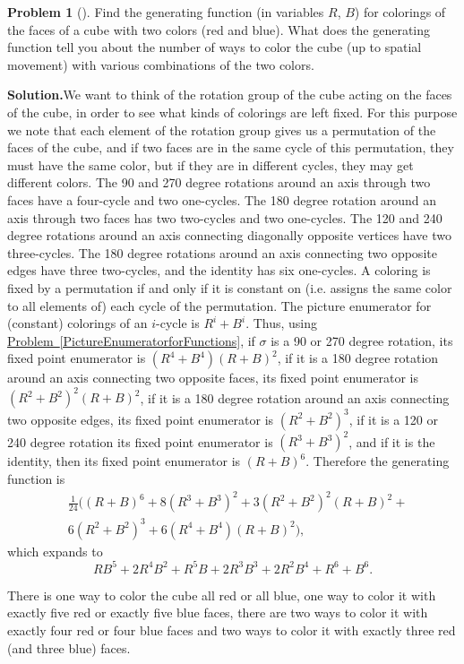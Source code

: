 \documentclass[10pt,]{book}
\theoremstyle{plain}
\theoremstyle{definition}
\newtheorem{activity}[project]{Problem}
\theoremstyle{definition}
\numberwithin{equation}{chapter}
\newcommand{\amp}{&}
\begin{document}
\begin{activity}[]\label{polya2}
Find the generating function (in variables \(R\), \(B\)) for colorings of the faces of a cube with two colors (red and blue). What does the generating function tell you about the number of ways to color the cube (up to spatial movement) with various combinations of the two colors.%
\par\medskip\noindent%
\textbf{Solution.}\quad We want to think of the rotation group of the cube acting on the faces of the cube, in order to see what kinds of colorings are left fixed. For this purpose we note that each element of the rotation group gives us a permutation of the faces of the cube, and if two faces are in the same cycle of this permutation, they must have the same color, but if they are in different cycles, they may get different colors. The 90 and 270 degree rotations around an axis through two faces have a four-cycle and two one-cycles. The 180 degree rotation around an axis through two faces has two two-cycles and two one-cycles. The 120 and 240 degree rotations around an axis connecting diagonally opposite vertices have two three-cycles. The 180 degree rotations around an axis connecting two opposite edges have three two-cycles, and the identity has six one-cycles. A coloring is fixed by a permutation if and only if it is constant on (i.e. assigns the same color to all elements of) each cycle of the permutation. The picture enumerator for (constant) colorings of an \(i\)-cycle is \(R^i+B^i\). Thus, using \hyperref[PictureEnumeratorforFunctions]{Problem~\ref{PictureEnumeratorforFunctions}}, if \(\sigma\) is a 90 or 270 degree rotation, its fixed point enumerator is \((R^4+B^4)(R+B)^2\), if it is a 180 degree rotation around an axis connecting two opposite faces, its fixed point enumerator is \((R^2+B^2)^2(R+B)^2\), if it is a 180 degree rotation around an axis connecting two opposite edges, its fixed point enumerator is \((R^2+B^2)^3\), if it is a 120 or 240 degree rotation its fixed point enumerator is \((R^3+B^3)^2\), and if it is the identity, then its fixed point enumerator is \((R+B)^6\). Therefore the generating function is%
\begin{align*}
\amp \frac{1}{24}\big((R+B)^6 + 8(R^3+B^3)^2 + 3(R^2+B^2)^2(R+B)^2 +\\
\amp 6
(R^2+B^2)^3 + 6 (R^4+B^4)(R+B)^2\big),
\end{align*}
which expands to%
\begin{equation*}
RB^5+2R^4B^2+R^5B+2R^3B^3+2R^2B^4+R^6+B^6\text{.}
\end{equation*}
%
\par
There is one way to color the cube all red or all blue, one way to color it with exactly five red or exactly five blue faces, there are two ways to color it with exactly four red or four blue faces and two ways to color it with exactly three red (and three blue) faces.%
\end{activity}
\typeout{************************************************}
\typeout{************************************************}
\end{document}
